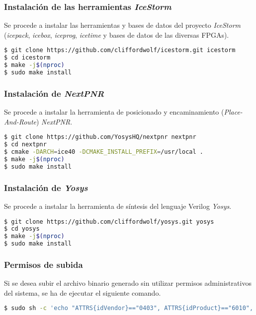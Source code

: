 \subsubsection{Instalación de las herramientas \emph{IceStorm}}
Se procede a instalar las herramientas y bases de datos del proyecto \emph{IceStorm} (\emph{icepack}, \emph{icebox}, \emph{iceprog}, \emph{icetime} y bases de datos de las diversas FPGAs).

\begin{lstlisting}[language=bash]
$ git clone https://github.com/cliffordwolf/icestorm.git icestorm
$ cd icestorm
$ make -j$(nproc)
$ sudo make install
\end{lstlisting}

\subsubsection{Instalación de \emph{NextPNR}}
Se procede a instalar la herramienta de posicionado y encaminamiento (\emph{Place-And-Route}) \emph{NextPNR}.

\begin{lstlisting}[language=bash]
$ git clone https://github.com/YosysHQ/nextpnr nextpnr
$ cd nextpnr
$ cmake -DARCH=ice40 -DCMAKE_INSTALL_PREFIX=/usr/local .
$ make -j$(nproc)
$ sudo make install
\end{lstlisting}

\subsubsection{Instalación de \emph{Yosys}}
Se procede a instalar la herramienta de síntesis del lenguaje Verilog \emph{Yosys}.

\begin{lstlisting}[language=bash]
$ git clone https://github.com/cliffordwolf/yosys.git yosys
$ cd yosys
$ make -j$(nproc)
$ sudo make install
\end{lstlisting}

\subsubsection{Permisos de subida}
Si se desea subir el archivo binario generado sin utilizar permisos administrativos del sistema, se ha de ejecutar el siguiente comando.
\begin{lstlisting}[language=bash]
$ sudo sh -c 'echo "ATTRS{idVendor}=="0403", ATTRS{idProduct}=="6010", MODE="0660", GROUP="plugdev", TAG+="uaccess"" > /etc/udev/rules.d/53-lattice-ftdi.rules'
\end{lstlisting}


